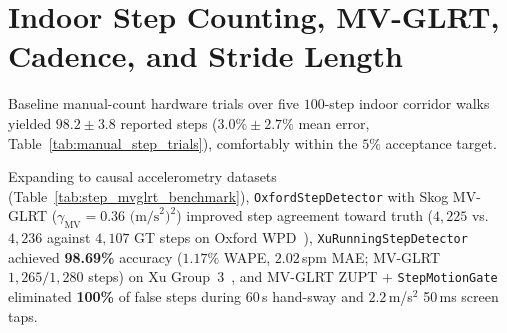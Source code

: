 \begin{table}[htbp]
\centering
\caption{Epoch-Level vs.\ Doorway Transition Detection on Cambridge CIOD ($46$ Ground-Truth Transits, $56.04$\,h).}
\label{tab:ciod_comprehensive_benchmark}
\end{table}

\section{Indoor Step Counting, MV-GLRT, Cadence, and Stride Length}
\label{sec:eval_cadence_benchmark}
Baseline manual-count hardware trials over five $100$-step indoor corridor walks~\cite{aetron2026prethesis} yielded $98.2 \pm 3.8$ reported steps ($3.0\% \pm 2.7\%$ mean error, Table~\ref{tab:manual_step_trials}), comfortably within the $5\%$ acceptance target.

Expanding to causal accelerometry datasets (Table~\ref{tab:step_mvglrt_benchmark}), \texttt{OxfordStepDetector} with Skog MV-GLRT ($\gamma_{\text{MV}}=0.36\text{ (m/s}^2)^2$) improved step agreement toward truth ($4{,}225$ vs.\ $4{,}236$ against $4{,}107$ GT steps on Oxford WPD~\cite{salvi2018oxford}), \texttt{XuRunningStepDetector} achieved \textbf{98.69\%} accuracy ($1.17\%$ WAPE, $2.02$\,spm MAE; MV-GLRT $1{,}265/1{,}280$ steps) on Xu Group~3~\cite{xu2022step}, and MV-GLRT ZUPT + \texttt{StepMotionGate} eliminated \textbf{100\%} of false steps during $60$\,s hand-sway and $2.2$\,m/s$^2$ 50\,ms screen taps.

